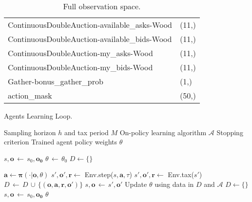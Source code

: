 \begin{table}[]
\begin{tabular}{ll}
    ContinuousDoubleAuction-available\_asks-Wood  & (11,)                                    \\ 
    ContinuousDoubleAuction-available\_bids-Wood  & (11,)                                    \\ 
    ContinuousDoubleAuction-my\_asks-Wood         & (11,)                                \\ 
    ContinuousDoubleAuction-my\_bids-Wood         & (11,)                                    \\ 
    Gather-bonus\_gather\_prob                    & (1,)                                     \\ 
    action\_mask                                  & (50,)                                    \\ \hline
    \end{tabular}
    \caption{\label{tab:full_obs} Full observation space.}
\end{table}




\begin{algorithm}
  \caption{Agents Learning Loop.}\label{alg:training}
  \begin{algorithmic}
    \Require Sampling horizon $h$ and tax period $M$
    \Require On-policy learning algorithm $\mathcal{A}$ 
    \Require Stopping criterion 
    \Ensure Trained agent policy weights $\theta$
    
        \State $s, \mathbf{o} \, \gets \, s_0, \mathbf{o_0}$ 
        \State $\theta \, \gets \, \theta_0$
        \State $D \gets \{\}$ 
        
                \State $\mathbf{a} \gets \mathbf{\pi}(\cdot|\mathbf{o}, \theta)$
                \State $s', \mathbf{o}', \mathbf{r} \gets$ Env.step($s, \mathbf{a}, \tau$)
                    \State $s', \mathbf{o}', \mathbf{r} \gets$ Env.tax($s'$)
                \EndIf
                \State $D\, \gets \, D \, \cup\, \{ (\mathbf{o},\mathbf{a},\mathbf{r},\mathbf{o}')\}$
                \State $s, \mathbf{o} \, \gets \, s', \mathbf{o}'$
            \EndFor
            \State Update $\theta$ using data in $D$ and $\mathcal{A}$
            \State $D \gets \{\}$
                $s, \mathbf{o} \, \gets \, s_0, \mathbf{o_0}$ 
            \EndIf
                \Return $\theta$
            \EndIf
        \EndWhile
  \end{algorithmic}
\end{algorithm}
